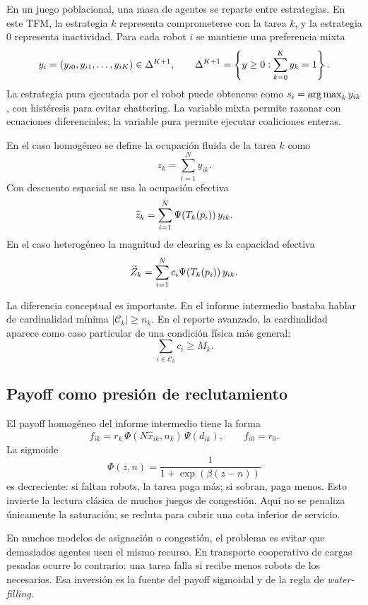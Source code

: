En un juego poblacional, una masa de agentes se reparte entre estrategias. En este TFM,
la estrategia $k$ representa comprometerse con la tarea $k$, y la estrategia $0$
representa inactividad. Para cada robot $i$ se mantiene una preferencia mixta
\[
  y_i=(y_{i0},y_{i1},\ldots,y_{iK})\in\Delta^{K+1},
  \qquad
  \Delta^{K+1}=\left\{y\ge0:\sum_{k=0}^K y_k=1\right\}.
\]
La estrategia pura ejecutada por el robot puede obtenerse como
$s_i=\operatorname*{arg\,max}_k y_{ik}$, con histéresis para evitar chattering. La variable mixta permite
razonar con ecuaciones diferenciales; la variable pura permite ejecutar coaliciones
enteras.

\begin{definicion}
En el caso homogéneo se define la ocupación fluida de la tarea $k$ como
\[
  z_k=\sum_{i=1}^N y_{ik}.
\]
Con descuento espacial se usa la ocupación efectiva
\[
  \widetilde{z}_k=\sum_{i=1}^N \Psi(T_k(p_i))\,y_{ik}.
\]
En el caso heterogéneo la magnitud de clearing es la capacidad efectiva
\[
  \widetilde{Z}_k=\sum_{i=1}^N c_i\Psi(T_k(p_i))\,y_{ik}.
\]
\end{definicion}

La diferencia conceptual es importante. En el informe intermedio bastaba hablar de
cardinalidad mínima $|\mathcal{C}_k|\ge n_k$. En el reporte avanzado, la cardinalidad
aparece como caso particular de una condición física más general:
\[
  \sum_{i\in\mathcal{C}_k} c_i\ge M_k.
\]

\subsection{Payoff como presión de reclutamiento}

El payoff homogéneo del informe intermedio tiene la forma
\[
  f_{ik}=r_k\,\Phi(N\hat{x}_{ik},n_k)\,\Psi(d_{ik}),
  \qquad
  f_{i0}=r_0.
\]
La sigmoide
\[
  \Phi(z,n)=\frac{1}{1+\exp(\beta(z-n))}
\]
es decreciente: si faltan robots, la tarea paga más; si sobran, paga menos. Esto invierte
la lectura clásica de muchos juegos de congestión. Aquí no se penaliza únicamente la
saturación; se recluta para cubrir una cota inferior de servicio.

\begin{observacion}
En muchos modelos de asignación o congestión, el problema es evitar que demasiados
agentes usen el mismo recurso. En transporte cooperativo de cargas pesadas ocurre lo
contrario: una tarea falla si recibe menos robots de los necesarios. Esa inversión es
la fuente del payoff sigmoidal y de la regla de \emph{water-filling}.
\end{observacion}

